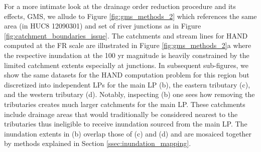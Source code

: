 \documentclass[draft]{dependencies/agujournal2019}
\begin{document}
For a more intimate look at the drainage order reduction procedure and its effects, GMS, we allude to Figure \ref{fig:gms_methods_2} which references the same area (in HUC8 12090301) and set of river junctions as in Figure \ref{fig:catchment_boundaries_issue}.
The catchments and stream lines for HAND computed at the FR scale are illustrated in Figure \ref{fig:gms_methods_2}a where the respective inundation at the 100 yr magnitude is heavily constrained by the limited catchment extents especially at junctions.
In subsequent sub-figures, we show the same datasets for the HAND computation problem for this region but discretized into independent LPs for the main LP (b), the eastern tributary (c), and the western tributary (d).
Notably, inspecting (b) one sees how removing the tributaries creates much larger catchments for the main LP. 
These catchments include drainage areas that would traditionally be considered nearest to the tributaries thus ineligible to receive inundation sourced from the main LP.
The inundation extents in (b) overlap those of (c) and (d) and are mosaiced together by methods explained in Section \ref{ssec:inundation_mapping}.
%
\end{document}

